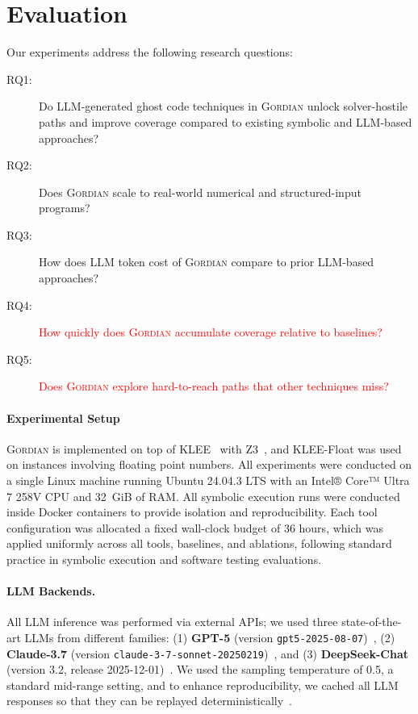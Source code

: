\documentclass[acmsmall,screen,nonacm]{acmart}
\newcommand{\rev}[1]{\textcolor{red}{#1}}
\newcommand{\rev}[1]{#1}
\newcommand{\projName}{\textsc{Gordian}\xspace}
\theoremstyle{definition}
\begin{document}
\section{Evaluation}
\label{sec:evaluation}

Our experiments address the following research questions:
\begin{description}
\item[RQ1:] Do LLM-generated ghost code techniques in \projName unlock solver-hostile paths and improve coverage compared to existing symbolic and LLM-based approaches?
\item[RQ2:] Does \projName scale to real-world numerical and structured-input programs?
\item[RQ3:] How does LLM token cost of \projName compare to prior LLM-based approaches?
\item[RQ4:] \rev{How quickly does \projName{} accumulate coverage relative to baselines?}
\item[RQ5:] \rev{Does \projName{} explore hard-to-reach paths that other techniques miss?}
\end{description}

\paragraph*{Experimental Setup} \projName is implemented on top of KLEE~\cite{klee} with Z3~\cite{de2008z3}, and KLEE-Float was used on instances involving floating point numbers. All experiments were conducted on a single Linux machine running Ubuntu 24.04.3 LTS with an Intel® Core™ Ultra 7 258V CPU and 32~GiB of RAM. All symbolic execution runs were conducted inside Docker containers to provide isolation and reproducibility. Each tool configuration was allocated a fixed wall-clock budget of 36 hours, which was applied uniformly across all tools, baselines, and ablations, following standard practice in symbolic execution and software testing evaluations.

\paragraph*{LLM Backends.} All LLM inference was performed via external APIs; we used three state-of-the-art LLMs from different families: (1) \textbf{GPT-5} (version \texttt{gpt5-2025-08-07})~\cite{openai_gpt5}, (2) \textbf{Claude-3.7} (version \texttt{claude-3-7-sonnet-20250219})~\cite{anthropicclaude}, and (3) \textbf{DeepSeek-Chat} (version 3.2, release 2025-12-01)~\cite{deepseekv3}. We used the sampling temperature of 0.5, a standard mid-range setting, and to enhance reproducibility, we cached all LLM responses so that they can be replayed deterministically~\cite{dai2025statisticalindependenceawarecaching}.
\end{document}
